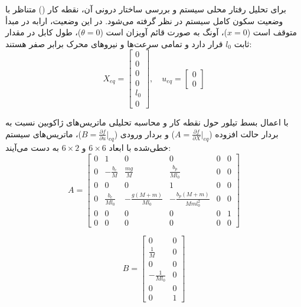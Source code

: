 برای تحلیل رفتار محلی سیستم و بررسی ساختار درونی آن، نقطه کار () متناظر با وضعیت سکون کامل سیستم در نظر گرفته می‌شود. در این وضعیت، ارابه در مبدأ متوقف است ($x=0$)، آونگ به صورت قائم آویزان است ($\theta=0$)، طول کابل در مقدار ثابت $l_0$ قرار دارد و تمامی سرعت‌ها و نیروهای محرک برابر صفر هستند:
\begin{equation}
    X_{eq} = \begin{bmatrix} 0 \\ 0 \\ 0 \\ 0 \\ l_0 \\ 0 \end{bmatrix}, \quad
    u_{eq} = \begin{bmatrix} 0 \\ 0 \end{bmatrix}
\end{equation}

با اعمال بسط تیلور حول نقطه کار و محاسبه تحلیلی ماتریس‌های ژاکوبین نسبت به بردار حالت افزوده ($A = \frac{\partial f}{\partial X}\big|_{eq}$) و بردار ورودی ($B = \frac{\partial f}{\partial u}\big|_{eq}$)، ماتریس‌های سیستم خطی‌شده با ابعاد $6 \times 6$ و $6 \times 2$ به دست می‌آیند:
\begin{equation}
    \renewcommand{\arraystretch}{1.5}
    A =
    \begin{bmatrix}
        0 & 1                 & 0                     & 0                           & 0 & 0 \\
        0 & -\frac{b_c}{M}    & \frac{mg}{M}          & \frac{b_p}{M l_0}           & 0 & 0 \\
        0 & 0                 & 0                     & 1                           & 0 & 0 \\
        0 & \frac{b_c}{M l_0} & -\frac{g(M+m)}{M l_0} & -\frac{b_p(M+m)}{M m l_0^2} & 0 & 0 \\
        0 & 0                 & 0                     & 0                           & 0 & 1 \\
        0 & 0                 & 0                     & 0                           & 0 & 0
    \end{bmatrix}
\end{equation}

\begin{equation}
    \renewcommand{\arraystretch}{1.5}
    B =
    \begin{bmatrix}
        0                & 0 \\
        \frac{1}{M}      & 0 \\
        0                & 0 \\
        -\frac{1}{M l_0} & 0 \\
        0                & 0 \\
        0                & 1
    \end{bmatrix}
\end{equation}

